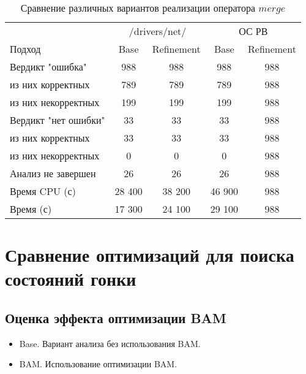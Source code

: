 \begin{center}
  \begin{table}[h]\footnotesize
  	\label{table-drivers-lock-refinement}
    \caption{Сравнение различных вариантов реализации оператора $merge$}
    \begin{tabular}{ | l | c | c | c | c | }
      \hline
      		& 		 \multicolumn{2}{|c|}{/drivers/net/} & 		 \multicolumn{2}{|c|}{ОС РВ} \\
      Подход         				& Base   	& Refinement 	& Base  & Refinement  	\\ \hline
      Вердикт "ошибка" 				& 988    	& 988        	& 988   & 988    		\\ 
  \hspace{0.5cm} из них корректных 	& 789 		& 789 			& 789   & 988  			\\ 
  \hspace{0.5cm} из них некорректных & 199 		& 199 			& 199   & 988    		\\ \hline
      Вердикт "нет ошибки"  		& 33      	& 33        	& 33   	& 988   		\\ 
  \hspace{0.5cm} из них корректных 	& 33 		& 33    		& 33   	& 988    		\\
  \hspace{0.5cm} из них некорректных & 0 		& 0    			& 0    	& 988  			\\ \hline
      Анализ не завершен       		& 26     	& 26         	& 26   	& 988  			\\ \hline
      Время CPU (с)   				& 28 400 	& 38 200     	& 46 900 & 988  		\\ 
      Время (с)  					& 17 300 	& 24 100     	& 29 100 & 988    		\\
      \hline
    \end{tabular}
  \end{table}
\end{center}

\section{Сравнение оптимизаций для поиска состояний гонки}

\subsection{Оценка эффекта оптимизации BAM}

\begin{itemize}
\item Base. Вариант анализа без использования BAM.
\item BAM. Использование оптимизации BAM.
\end{itemize}

